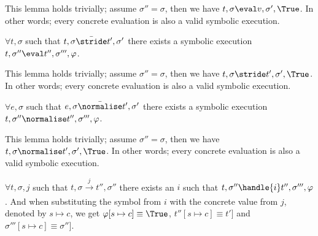 This lemma holds trivially; assume $\sigma''=\sigma$, then we have $t,\sigma\eval v,\sigma',\True$. In other words; every concrete evaluation is also a valid symbolic execution.

\begin{lemma}
  $\forall t,\sigma$ such that $t,\sigma \bar{\stride}t',\sigma'$
  there exists a symbolic execution $t,\sigma''\eval t'',\sigma''',\phi$.
\end{lemma}

This lemma holds trivially; assume $\sigma''=\sigma$, then we have $t,\sigma\stride t',\sigma',\True$. In other words; every concrete evaluation is also a valid symbolic execution.

\begin{lemma}
  $\forall e,\sigma$ such that $e,\sigma \bar{\normalise}t',\sigma'$
  there exists a symbolic execution $t,\sigma''\normalise t'',\sigma''',\phi$.
\end{lemma}

This lemma holds trivially; assume $\sigma''=\sigma$, then we have $t,\sigma\normalise t',\sigma',\True$. In other words; every concrete evaluation is also a valid symbolic execution.

\begin{lemma}
  $\forall t,\sigma,j$ such that $t,\sigma \xrightarrow[]{j} t'',\sigma''$
  there exists an $i$ such that $t,\sigma''\handle{i} t'',\sigma''',\phi$. And when substituting the symbol from $i$ with the concrete value from $j$, denoted by $s\mapsto c$, we get $\phi[s\mapsto c]\equiv\True$, $t''[s\mapsto c]\equiv t']$ and $\sigma'''[s\mapsto c]\equiv\sigma'']$.
\end{lemma}

\begin{lemma}
\end{lemma}

